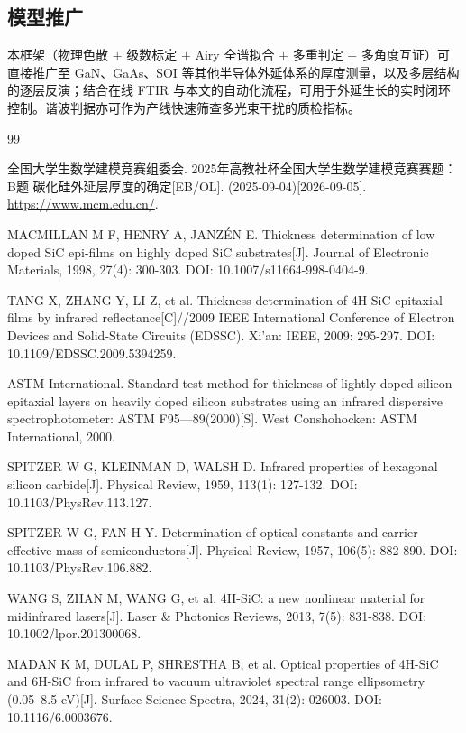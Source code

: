 \documentclass[11pt,a4paper,fontset=fandol]{ctexart}
\begin{document}
\subsection{模型推广}
本框架（物理色散 $+$ 级数标定 $+$ Airy 全谱拟合 $+$ 多重判定 $+$ 多角度互证）可直接推广至 GaN、GaAs、SOI 等其他半导体外延体系的厚度测量，以及多层结构的逐层反演；结合在线 FTIR 与本文的自动化流程，可用于外延生长的实时闭环控制。谐波判据亦可作为产线快速筛查多光束干扰的质检指标。

\begin{thebibliography}{99}
    \raggedright
    \setlength{\itemsep}{0.15em}
    \small

     全国大学生数学建模竞赛组委会. 2025年高教社杯全国大学生数学建模竞赛赛题：B题 碳化硅外延层厚度的确定[EB/OL]. (2025-09-04)[2026-09-05]. \url{https://www.mcm.edu.cn/}.

     MACMILLAN M F, HENRY A, JANZÉN E. Thickness determination of low doped SiC epi-films on highly doped SiC substrates[J]. Journal of Electronic Materials, 1998, 27(4): 300-303. DOI: 10.1007/s11664-998-0404-9.

     TANG X, ZHANG Y, LI Z, et al. Thickness determination of 4H-SiC epitaxial films by infrared reflectance[C]//2009 IEEE International Conference of Electron Devices and Solid-State Circuits (EDSSC). Xi'an: IEEE, 2009: 295-297. DOI: 10.1109/EDSSC.2009.5394259.

     ASTM International. Standard test method for thickness of lightly doped silicon epitaxial layers on heavily doped silicon substrates using an infrared dispersive spectrophotometer: ASTM F95—89(2000)[S]. West Conshohocken: ASTM International, 2000.

     SPITZER W G, KLEINMAN D, WALSH D. Infrared properties of hexagonal silicon carbide[J]. Physical Review, 1959, 113(1): 127-132. DOI: 10.1103/PhysRev.113.127.

     SPITZER W G, FAN H Y. Determination of optical constants and carrier effective mass of semiconductors[J]. Physical Review, 1957, 106(5): 882-890. DOI: 10.1103/PhysRev.106.882.

     WANG S, ZHAN M, WANG G, et al. 4H-SiC: a new nonlinear material for midinfrared lasers[J]. Laser \& Photonics Reviews, 2013, 7(5): 831-838. DOI: 10.1002/lpor.201300068.

     MADAN K M, DULAL P, SHRESTHA B, et al. Optical properties of 4H-SiC and 6H-SiC from infrared to vacuum ultraviolet spectral range ellipsometry (0.05--8.5 eV)[J]. Surface Science Spectra, 2024, 31(2): 026003. DOI: 10.1116/6.0003676.


\end{thebibliography}
\end{document}

